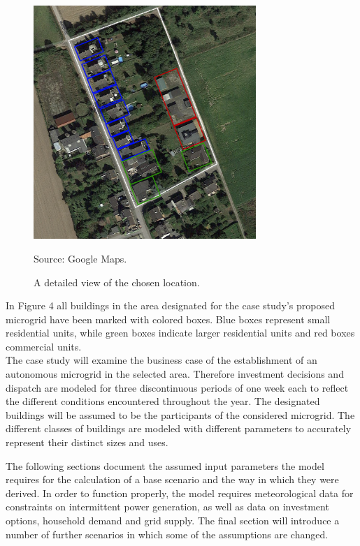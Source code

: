 \documentclass[
	11pt,								%
	DIV10,								%
	a4paper,         					%
	oneside,							%
	headheight=20pt,					%
	footheight=20pt,					%
    parskip=full,						%
    listof=totoc,						%
	bibliography=totoc,					%
	index=totoc,						%
]{scrartcl}
\begin{document}
\begin{figure}[H]
	\centering
	\includegraphics[width=0.75\textwidth]{pictures/Detail_Layout.png}
	\caption{A detailed view of the chosen location.}
	\label{morschenich_detail}
	\flushleft\quad\quad\footnotesize{Source: Google Maps.}
\end{figure}	

In Figure 4 all buildings in the area designated for the case study's proposed microgrid have been marked with colored boxes. Blue boxes represent small residential units, while green boxes indicate larger residential units and red boxes commercial units.
\\
The case study will examine the business case of the establishment of an autonomous microgrid in the selected area. Therefore investment decisions and dispatch are modeled for three discontinuous periods of one week each to reflect the different conditions encountered throughout the year. The designated buildings will be assumed to be the participants of the considered microgrid. The different classes of buildings are modeled with different parameters to accurately represent their distinct sizes and uses.

 The following sections document the assumed input parameters the model requires for the calculation of a base scenario and the way in which they were derived. In order to function properly, the model requires meteorological data for constraints on intermittent power generation, as well as data on investment options, household demand and grid supply. The final section will introduce a number of further scenarios in which some of the assumptions are changed.
\end{document}
